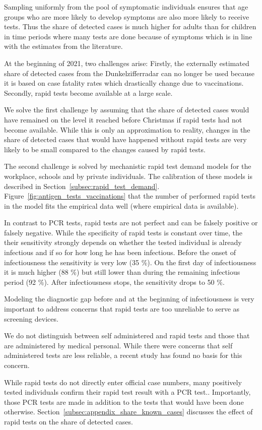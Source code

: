 Sampling uniformly from the pool of symptomatic individuals ensures that age groups
who are more likely to develop symptoms are also more likely to receive tests. Thus the
share of detected cases is much higher for adults than for children in time
periods where many tests are done because of symptoms which is in line with the
estimates from the literature.

At the beginning of 2021, two challenges arise: Firstly, the externally estimated share
of detected cases from the Dunkelzifferradar can no longer be used because it is based
on case fatality rates which drastically change due to vaccinations. Secondly, rapid
tests become available at a large scale.

We solve the first challenge by assuming that the share of detected cases would have
remained on the level it reached before Christmas if rapid tests had not become
available. While this is only an approximation to reality, changes in the share of
detected cases that would have happened without rapid tests are very likely to be small
compared to the changes caused by rapid tests.

The second challenge is solved by mechanistic rapid test demand models for the
workplace, schools and by private individuals. The calibration of these models is
described in Section~\ref{subsec:rapid_test_demand}.
Figure~\ref{fig:antigen_tests_vaccinations} that the number of performed rapid tests in
the model fits the empirical data well (where empirical data is available).

In contrast to PCR tests, rapid tests are not perfect and can be falsely positive or
falsely negative. While the specificity of rapid tests is constant over time, the
their sensitivity strongly depends on whether the tested individual is already
infectious and if so for how long he has been infectious. Before the onset of
infectiousness the sensitivity is very low (35 \%). On the first day of infectiousness
it is much higher (88 \%) but still lower than during the remaining infectious
period (92 \%). After infectiousness stops, the sensitivity drops to 50 \%.

Modeling the diagnostic gap before and at the beginning of infectiousness is very
important to address concerns that rapid tests are too unreliable to serve as screening
devices.

We do not distinguish between self administered and rapid tests and those that are
administered by medical personal. While there were concerns that self administered tests
are less reliable, a recent study has found no basis for this
concern.

While rapid tests do not directly enter official case numbers, many positively tested
individuals confirm their rapid test result with a PCR test..
Importantly, those PCR tests are made in addition to the tests that would have been
done otherwise. Section~\ref{subsec:appendix_share_known_cases} discusses the effect
of rapid tests on the share of detected cases.
